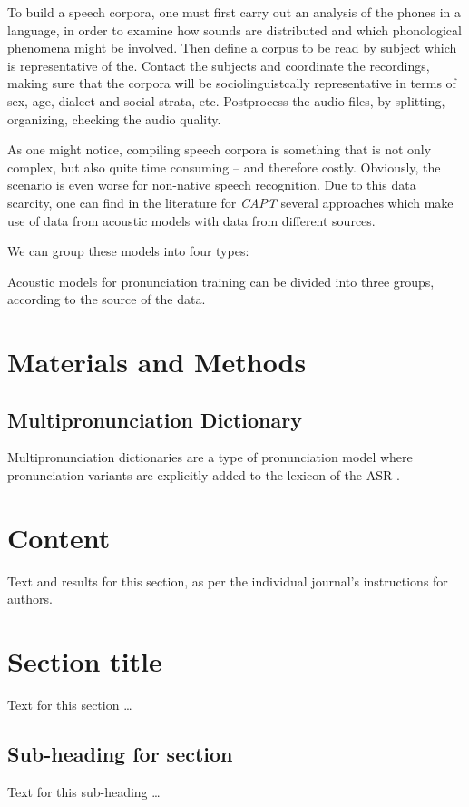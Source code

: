 \documentclass[twocolumn]{bmcart}%
\begin{document}
To build a speech corpora, one must first carry out an analysis of the phones in a language, in order to examine how sounds are distributed and which phonological phenomena might be involved. Then define a corpus to be read by subject which is representative of the. Contact the subjects and coordinate the recordings, making sure that the corpora will be sociolinguistcally representative in terms of sex, age, dialect and social strata, etc. Postprocess the audio files, by splitting, organizing, checking the audio quality.

As one might notice, compiling speech corpora is something that is not only complex, but also quite time consuming -- and therefore costly. Obviously, the scenario is even worse for non-native speech recognition.
Due to this data scarcity, one can find in the literature for \emph{CAPT} several approaches which make use of data from acoustic models with data from different sources.

We can group these models into four types:


Acoustic models for pronunciation training can be divided into three groups,
according to the source of the data. 

\section*{Materials and Methods}
\subsection*{\textbf{Multipronunciation Dictionary}}

Multipronunciation dictionaries are a type of pronunciation model where pronunciation variants are explicitly added to the lexicon of the ASR \cite{Strik2001}.


\section*{Content}
Text and results for this section, as per the individual journal's instructions for authors. %

\section*{Section title}
Text for this section \ldots
\subsection*{Sub-heading for section}
Text for this sub-heading \ldots
\end{document}

